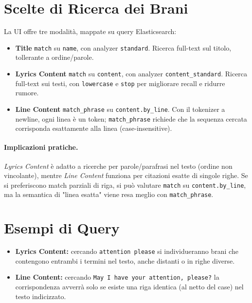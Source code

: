 \documentclass[a4paper,11pt]{article}
\begin{document}
\section{Scelte di Ricerca dei Brani}
La UI offre tre modalità, mappate su query Elasticsearch:
\begin{itemize}[topsep=2pt,itemsep=2pt]
  \item \textbf{Title} \rightarrow \texttt{match} su \texttt{name}, con analyzer \texttt{standard}. Ricerca full-text sul titolo, tollerante a ordine/parole.
  \item \textbf{Lyrics Content} \rightarrow \texttt{match} su \texttt{content}, con analyzer \texttt{content\_standard}. Ricerca full-text sui testi, con \texttt{lowercase} e \texttt{stop} per migliorare recall e ridurre rumore.
  \item \textbf{Line Content} \rightarrow \texttt{match\_phrase} su \texttt{content.by\_line}. Con il tokenizer a newline, ogni linea è un token; \texttt{match\_phrase} richiede che la sequenza cercata corrisponda esattamente alla linea (case-insensitive).
\end{itemize}
\paragraph{Implicazioni pratiche.} \emph{Lyrics Content} è adatto a ricerche per parole/parafrasi nel testo (ordine non vincolante), mentre \emph{Line Content} funziona per citazioni esatte di singole righe. Se si preferiscono match parziali di riga, si può valutare \texttt{match} su \texttt{content.by\_line}, ma la semantica di "linea esatta" viene resa meglio con \texttt{match\_phrase}.

\section{Esempi di Query}
\begin{itemize}[nosep]
  \item \textbf{Lyrics Content:} cercando \texttt{attention please} si individueranno brani che contengono entrambi i termini nel testo, anche distanti o in righe diverse.
  \item \textbf{Line Content:} cercando \texttt{May I have your attention, please?} la corrispondenza avverrà solo se esiste una riga identica (al netto del case) nel testo indicizzato.
\end{itemize}
\end{document}
